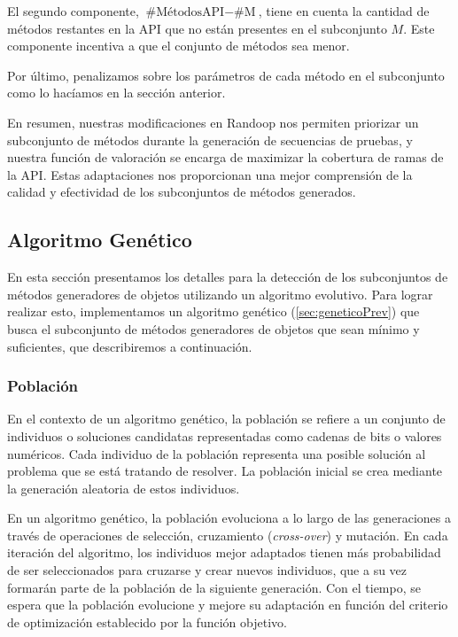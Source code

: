 El segundo componente, $\text{{\#MétodosAPI}} - \text{{\#M}}$, tiene en cuenta la cantidad de métodos restantes en la API que no están presentes en el subconjunto $M$. Este componente incentiva a que el conjunto de métodos sea menor.

Por último, penalizamos sobre los parámetros de cada método en el subconjunto como lo hacíamos en la sección anterior.

En resumen, nuestras modificaciones en Randoop nos permiten priorizar un subconjunto de métodos durante la generación de secuencias de pruebas, y nuestra función de valoración se encarga de maximizar la cobertura de ramas de la API. Estas adaptaciones nos proporcionan una mejor comprensión de la calidad y efectividad de los subconjuntos de métodos generados.



\subsection{Algoritmo Genético}
\label{alg:approachGA}

En esta sección presentamos los detalles para la detección de los subconjuntos de métodos generadores de objetos utilizando un algoritmo evolutivo. Para lograr realizar esto, implementamos un algoritmo genético (\ref{sec:geneticoPrev}) que busca el subconjunto de métodos generadores de objetos que sean mínimo y suficientes, que describiremos a continuación.








\subsubsection{Población}

En el contexto de un algoritmo genético, la población se refiere a un conjunto de individuos o soluciones candidatas representadas como cadenas de bits o valores numéricos. Cada individuo de la población representa una posible solución al problema que se está tratando de resolver. La población inicial se crea mediante la generación aleatoria de estos individuos.

En un algoritmo genético, la población evoluciona a lo largo de las generaciones a través de operaciones de selección, cruzamiento (\emph{cross-over}) y mutación. En cada iteración del algoritmo, los individuos mejor adaptados tienen más probabilidad de ser seleccionados para cruzarse y crear nuevos individuos, que a su vez formarán parte de la población de la siguiente generación. Con el tiempo, se espera que la población evolucione y mejore su adaptación en función del criterio de optimización establecido por la función objetivo.

